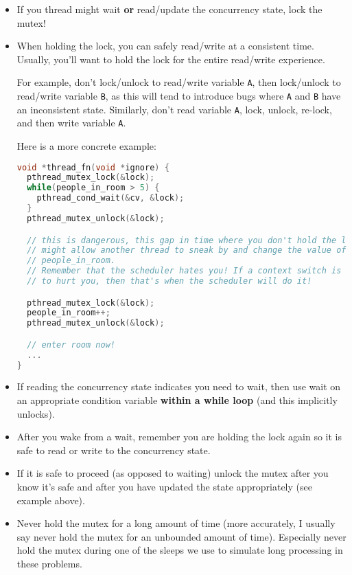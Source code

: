 \documentclass[11pt,usletter]{article}
\begin{document}
\begin{itemize}
  \item If you thread might wait {\bf or} read/update the concurrency state,
    lock the mutex!

  \item When holding the lock, you can safely read/write at a consistent time.
    Usually, you'll want to hold the lock for the entire read/write experience.

    \noindent For example, don't lock/unlock to read/write variable {\tt A},
    then lock/unlock to read/write variable {\tt B}, as this will tend to
    introduce bugs where {\tt A} and {\tt B} have an inconsistent state.
    Similarly, don't read variable {\tt A}, lock, unlock, re-lock, and then
    write variable {\tt A}.

    Here is a more concrete example:

    \begin{lstlisting}[style=netseclab,language=c]
void *thread_fn(void *ignore) {
  pthread_mutex_lock(&lock);
  while(people_in_room > 5) {
    pthread_cond_wait(&cv, &lock);
  }
  pthread_mutex_unlock(&lock);

  // this is dangerous, this gap in time where you don't hold the lock
  // might allow another thread to sneak by and change the value of
  // people_in_room.
  // Remember that the scheduler hates you! If a context switch is going
  // to hurt you, then that's when the scheduler will do it!

  pthread_mutex_lock(&lock);
  people_in_room++;
  pthread_mutex_unlock(&lock);

  // enter room now!
  ...
}
    \end{lstlisting}

  \item If reading the concurrency state indicates you need to wait, then use
    wait on an appropriate condition variable {\bf within a while loop} (and
    this implicitly unlocks).

  \item  After you wake from a wait, remember you are holding the lock again so
    it is safe to read or write to the concurrency state.

  \item  If it is safe to proceed (as opposed to waiting) unlock the mutex
    after you know it’s safe and after you have updated the state appropriately
    (see example above).

  \item  Never hold the mutex for a long amount of time (more accurately, I
    usually say never hold the mutex for an unbounded amount of time).
    Especially never hold the mutex during one of the sleeps we use to simulate
    long processing in these problems. 


\end{itemize}
\end{document}
